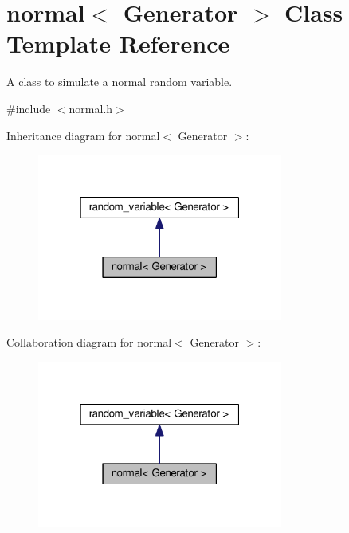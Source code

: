 \hypertarget{classnormal}{}\section{normal$<$ Generator $>$ Class Template Reference}
\label{classnormal}


A class to simulate a normal random variable.  




{\ttfamily \#include $<$normal.\+h$>$}



Inheritance diagram for normal$<$ Generator $>$\+:\nopagebreak
\begin{figure}[H]
\begin{center}
\leavevmode
\includegraphics[width=229pt]{classnormal__inherit__graph}
\end{center}
\end{figure}


Collaboration diagram for normal$<$ Generator $>$\+:\nopagebreak
\begin{figure}[H]
\begin{center}
\leavevmode
\includegraphics[width=229pt]{classnormal__coll__graph}
\end{center}
\end{figure}
